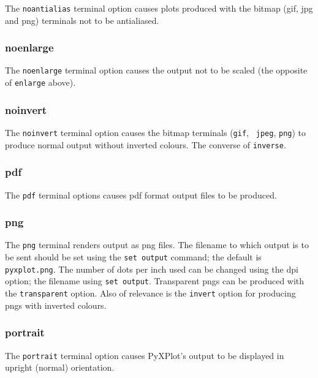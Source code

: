 The {\tt noantialias} terminal option causes plots produced with the bitmap
(gif, jpg and png) terminals not to be antialiased.

\subsubsection{noenlarge}

The {\tt noenlarge} terminal option causes the output not to be scaled (the
opposite of {\tt enlarge} above).

\subsubsection{noinvert}

The {\tt noinvert} terminal option causes the bitmap terminals ({\tt gif}, {\tt
jpeg}, {\tt png}) to produce normal output without inverted colours. The
converse of {\tt inverse}.


\subsubsection{pdf}

The {\tt pdf} terminal options causes pdf format output files to be produced.

\subsubsection{png}

The {\tt png} terminal renders output as png files. The filename to which output
is to be sent should be set using the {\tt set output} command; the default is
{\tt pyxplot.png}. The number of dots per inch used can be changed using the dpi
option; the filename using {\tt set output}. Transparent pngs can be produced
with the {\tt transparent} option. Also of relevance is the {\tt invert} option
for producing pngs with inverted colours.


\subsubsection{portrait}

The {\tt portrait} terminal option causes PyXPlot's output to be displayed in
upright (normal) orientation.
 

